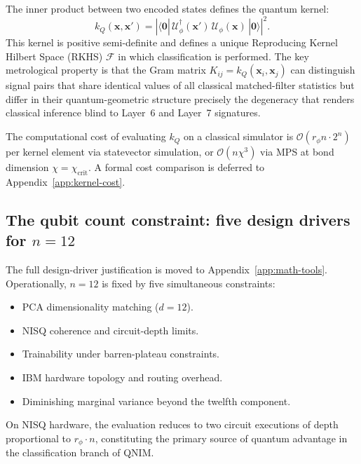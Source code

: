 \documentclass[11pt,a4paper, english]{book}
\theoremstyle{plain}
\theoremstyle{definition}
\numberwithin{equation}{chapter}
\numberwithin{figure}{chapter}
\numberwithin{table}{chapter}
\begin{document}
The inner product between two encoded states defines the quantum kernel:
\begin{equation}
  \label{eq:qk_inner}
  k_Q(\mathbf{x}, \mathbf{x}') =
    \left|\langle\mathbf{0}|\,
    \mathcal{U}_\phi^\dagger(\mathbf{x}')\,
    \mathcal{U}_\phi(\mathbf{x})\,
    |\mathbf{0}\rangle\right|^2.
\end{equation}
This kernel is positive semi-definite and defines a unique Reproducing
Kernel Hilbert Space (RKHS) $\mathcal{F}$ in which classification is
performed.  The key metrological property is that the Gram matrix
$K_{ij} = k_Q(\mathbf{x}_i, \mathbf{x}_j)$ can distinguish signal
pairs that share identical values of all classical matched-filter
statistics but differ in their quantum-geometric structure  precisely
the degeneracy that renders classical inference blind to Layer~6 and
Layer~7 signatures.

The computational cost of evaluating $k_Q$ on a classical simulator is
$\mathcal{O}(r_\phi n \cdot 2^n)$ per kernel element via statevector
simulation, or $\mathcal{O}(n\chi^3)$ via MPS at bond dimension
$\chi = \chi_\mathrm{crit}$. A formal cost comparison is deferred to Appendix~\ref{app:kernel-cost}.

\subsection{The qubit count constraint: five design drivers for $n = 12$}
\label{subsec:qubit-justification}

The full design-driver justification is moved to Appendix~\ref{app:math-tools}. Operationally, $n=12$ is fixed by five simultaneous constraints:
\begin{itemize}
  \item PCA dimensionality matching ($d=12$).
  \item NISQ coherence and circuit-depth limits.
  \item Trainability under barren-plateau constraints.
  \item IBM hardware topology and routing overhead.
  \item Diminishing marginal variance beyond the twelfth component.
\end{itemize}

On NISQ hardware, the evaluation reduces to two circuit executions of
depth proportional to $r_\phi \cdot n$, constituting the primary source
of quantum advantage in the classification branch of QNIM.


\end{document}
